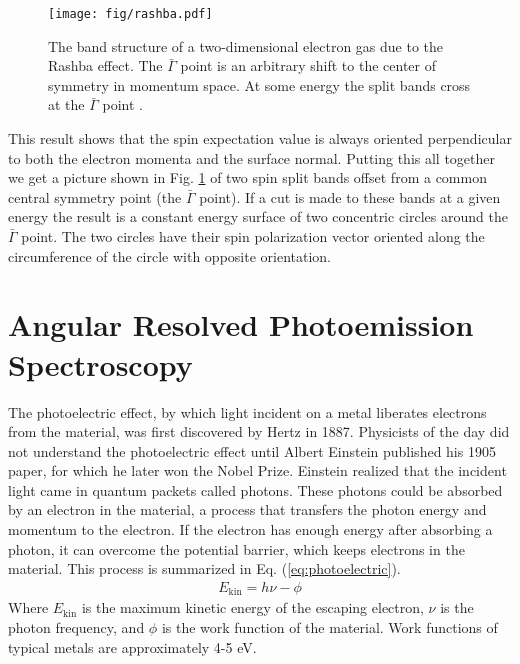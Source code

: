 \documentclass[12pt]{article}
\begin{document}
\begin{figure}[th]
  \centering
  \texttt{[image: fig/rashba.pdf]}
  \caption{The band structure of a two-dimensional electron gas due to the Rashba effect.  The $\bar{\Gamma}$ point is an arbitrary shift to the center of symmetry in momentum space.  At some energy the split bands cross at the $\bar{\Gamma}$ point \cite{Dil}.}
  \label{fig:rashba}
\end{figure}
This result shows that the spin expectation value is always oriented perpendicular to both the electron momenta and the surface normal.
Putting this all together we get a picture shown in Fig. \ref{fig:rashba} of two spin split bands offset from a common central symmetry point (the $\bar{\Gamma}$ point).
If a cut is made to these bands at a given energy the result is a constant energy surface of two concentric circles around the $\bar{\Gamma}$ point.
The two circles have their spin polarization vector oriented along the circumference of the circle with opposite orientation.

\section{Angular Resolved Photoemission Spectroscopy}
The photoelectric effect, by which light incident on a metal liberates electrons from the material, was first discovered by Hertz in 1887.
Physicists of the day did not understand the photoelectric effect until Albert Einstein published his 1905 paper, for which he later won the Nobel Prize.
Einstein realized that the incident light came in quantum packets called photons.
These photons could be absorbed by an electron in the material, a process that transfers the photon energy and momentum to the electron.
If the electron has enough energy after absorbing a photon, it can overcome the potential barrier, which keeps electrons in the material.
This process is summarized in Eq. (\ref{eq:photoelectric}).
\begin{align}
  \label{eq:photoelectric}
  E_{\text{kin}}=h\nu-\phi
\end{align}
Where $E_{\text{kin}}$ is the maximum kinetic energy of the escaping electron, $\nu$ is the photon frequency, and $\phi$ is the work function of the material.
Work functions of typical metals are approximately 4-5 eV.
\end{document}
